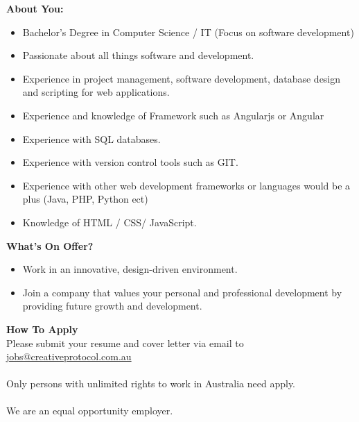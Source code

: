 \documentclass[11pt, oneside, a4paper, titlepage]{article}
\begin{document}
\hfill \break
\textbf{About You:}
\begin{itemize}
	\item Bachelor’s Degree in Computer Science / IT (Focus on software development) 
    	\item Passionate about all things software and development. 
    	\item Experience in project management, software development, database design and scripting for web applications. 
    	\item Experience and knowledge of Framework such as Angularjs or Angular 
    	\item Experience with SQL databases. 
    	\item Experience with version control tools such as GIT. 
    	\item Experience with other web development frameworks or languages would be a plus (Java, PHP, Python ect) 
    	\item Knowledge of HTML / CSS/ JavaScript. 
\end{itemize}
\hfill \break
\textbf{What's On Offer?}
\begin{itemize}
	\item Work in an innovative, design-driven environment. 
    	\item Join a company that values your personal and professional development by providing future growth and development. 
\end{itemize}
\hfill \break
\textbf{How To Apply}
\\
Please submit your resume and cover letter via email to \href{mailto:jobs@creativeprotocol.com.au}{jobs@creativeprotocol.com.au}
\\
\\
Only persons with unlimited rights to work in Australia need apply. 
\\
\\
We are an equal opportunity employer. 
\newpage
\end{document}

